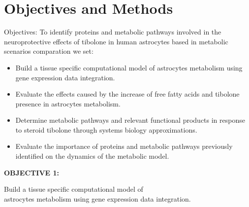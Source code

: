 \documentclass[11pt]{beamer}
\begin{document}
\section{Objectives and Methods}
\begin{frame}{Objectives:}
To identify proteins and metabolic pathways involved in the neuroprotective effects of tibolone in human astrocytes based in metabolic scenarios comparation we set:
\begin{itemize}
\item Build a tissue specific computational model of astrocytes metabolism using gene expression data integration.
\item Evaluate the effects caused by the increase of free fatty acids and tibolone presence in astrocytes metabolism.
\item Determine metabolic pathways and relevant functional products in response to steroid tibolone through systems biology approximations.
\item Evaluate the importance of proteins and metabolic pathways previously identified on the dynamics of the metabolic model.
\end{itemize}
\end{frame}
\begin{frame}
\begin{block}{\textbf{OBJECTIVE 1:}}
\begin{center}
Build a tissue specific computational model of \\astrocytes metabolism using gene expression data integration.
\end{center}\end{block}
\end{frame}
\end{document}
